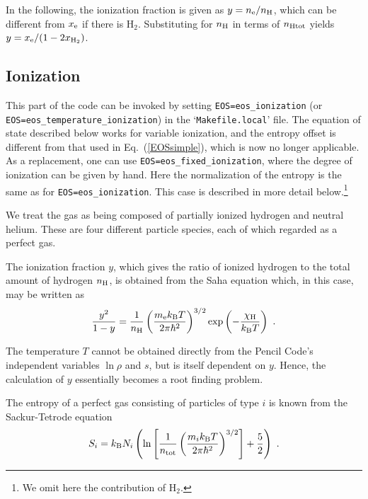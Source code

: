 \documentclass[\mydriver,12pt,twoside,notitlepage,a4paper]{article}
\makeatletter
\newcommand{\code}[1]{\texttt{#1}}
\newcommand{\file}[2][]{%
  \def\index@{#1}%
  `\texttt{#2}'%
  \ifx\index@\@empty\index[file]{#2@\texttt{#2}}%
  \else\index[file]{#1@\texttt{#1}}%
  \fi%
}
\makeatother
\begin{document}
In the following, the ionization fraction is given as $y=n_{\rm e}/n_{\rm H}$,
which can be different from $x_{\rm e}$ if there is H$_2$.
Substituting for $n_{\rm H}$ in terms of $n_{\rm Htot}$ yields
$y=x_{\rm e}/(1-2x_{\rm H_2})$.


\subsection{Ionization}
\label{S-ionization}

This part of the code can be invoked by setting \code{EOS=eos_ionization}
(or \code{EOS=eos_temperature_ionization}) in the \file{Makefile.local} file.
The equation of state described below works for variable ionization, and the
entropy offset is different from that used in Eq.~(\ref{EOSsimple}), which
is now no longer applicable.  As a replacement, one can use
\code{EOS=eos_fixed_ionization}, where the degree of ionization can be given
by hand.  Here the normalization of the entropy is the same as for
\code{EOS=eos_ionization}.  This case is described in more detail
below.\footnote{We omit here the contribution of H$_2$.}

We treat the gas as being composed of partially ionized hydrogen and neutral
helium. These are four different particle species, each of which regarded as
a perfect gas.

The ionization fraction $y$, which gives the ratio of ionized hydrogen to the
total amount of hydrogen $n_{\rm H}$, is obtained from the Saha equation
which, in this case, may be written as
\begin{equation}
\frac{y^2}{1-y}=\frac{1}{n_{\rm H}}
\left(\frac{m_{\rm e}k_{\rm B}T}{2\pi\hbar^2}\right)^{3/2}
\exp\left(-\frac{\chi_{\rm H}}{k_{\rm B}T}\right)\ .
\end{equation}

The temperature $T$ cannot be obtained directly from the {\sc Pencil Code}'s
independent variables $\ln\rho$ and $s$, but is itself dependent on $y$.
Hence, the calculation of $y$ essentially becomes a root finding problem.

The entropy of a perfect gas consisting of particles of type $i$ is known from
the Sackur-Tetrode equation
\begin{equation}
S_i=k_{\rm B}N_i\left(\ln\left[\frac{1}{n_{\rm tot}}
                               \left(\frac{m_ik_{\rm B}T}
                                     {2\pi\hbar^2}\right)^{3/2}\right]
                      +\frac{5}{2}\right)\ .
\end{equation}
\end{document}

